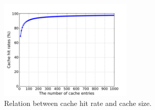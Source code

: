 \begin{figure}[t!]
\begin{center}
\includegraphics[width=2.5in]{figure/LRU}
\caption{Relation between cache hit rate and cache size.}
\label{fig:cache}
\end{center}
\end{figure}